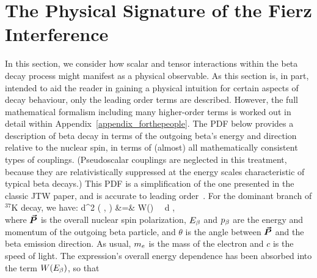 \section{The Physical Signature of the Fierz Interference}
\label{sec:mathdescription_intro}
In this section, we consider how scalar and tensor interactions within the beta decay process might manifest as a physical observable.  As this section is, in part, intended to aid the reader in gaining a physical intuition for certain aspects of decay behaviour, only the leading order terms are described. However, the full mathematical formalism including many higher-order terms is worked out in detail within Appendix~\ref{appendix_forthepeople}.
The \ac{PDF} below provides a description of beta decay in terms of the outgoing beta's energy and direction relative to the nuclear spin, in terms of (almost) all mathematically consistent types of couplings. (Pseudoscalar couplings are neglected in this treatment, because they are relativistically suppressed at the energy scales characteristic of typical beta decays.)  This \ac{PDF} is a simplification of the one presented in the classic \ac{JTW} paper, and is accurate to leading order~\cite{jtw}\cite{jtw_coulomb}\cite{EbelFeldman1957}.  For the dominant branch of $^{37}$K decay, we have:
\bea
	\textrm{d}^2 \Gamma  ( \Ebeta, \theta ) 
	&=&
	W(\Ebeta)  \, \dEe \, \textrm{d} \theta , 
\nonumber \\
\label{equation:integrated_jtw_INTRODUCTION}
\eea
where $\bm{\vec{P}}$ is the overall nuclear spin polarization, $E_{\beta}$ and $p_{\beta}$ are the energy and momentum of the outgoing beta particle, and $\theta$ is the angle between $\bm{\vec{P}}$ and the beta emission direction.  
As usual, $m_e$ is the mass of the electron and $c$ is the speed of light.
The expression's overall energy dependence has been absorbed into the term $W(E_{\beta})$, so that
